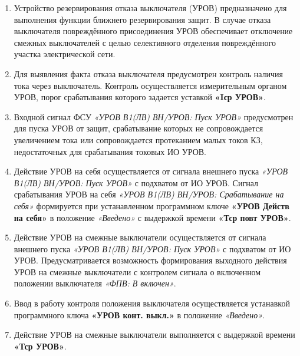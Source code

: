 \color{black}

\begin{enumerate}

\item
Устройство резервирования отказа выключателя (УРОВ) предназначено для выполнения функции ближнего резервирования защит. В случае отказа выключателя повреждённого присоединения УРОВ обеспечивает отключение смежных выключателей с целью селективного отделения повреждённого участка электрической сети.

\item
Для выявления факта отказа выключателя предусмотрен контроль наличия тока через выключатель. Контроль осуществляется измерительным органом УРОВ, порог срабатывания которого задается уставкой \textbf{«Iср УРОВ»}.

\item
Входной сигнал ФСУ \textit{«УРОВ В1(ЛВ) ВН/УРОВ: Пуск УРОВ»} предусмотрен для пуска УРОВ от защит, срабатывание которых не сопровождается увеличением тока или сопровождается протеканием малых токов КЗ, недостаточных для срабатывания токовых ИО УРОВ.

\item
Действие УРОВ на себя осуществляется от сигнала внешнего пуска \textit{«УРОВ В1(ЛВ) ВН/УРОВ: Пуск УРОВ»} с подхватом от ИО УРОВ.
Сигнал срабатывания УРОВ на себя \textit{«УРОВ В1(ЛВ) ВН/УРОВ: Срабатывание на себя»} формируется при устанавленном программном ключе \textbf{«УРОВ Действ на себя»} в положение \textit{«Введено»} с выдержкой времени \textbf{«Тср повт УРОВ»}.

\item
Действие УРОВ на смежные выключатели осуществляется от сигнала внешнего пуска \textit{«УРОВ В1(ЛВ) ВН/УРОВ: Пуск УРОВ»} с подхватом от ИО УРОВ. Предусматривается возможность формирования выходного действия УРОВ на смежные выключатели с контролем сигнала о включенном положении выключателя \textit{«ФПВ: В включен»}.

\item
Ввод в работу контроля положения выключателя осуществляется устанавкой программного ключа \textbf{«УРОВ конт. выкл.»} в положение \textit{«Введено»}.

\item
Действие УРОВ на смежные выключатели выполняется с выдержкой времени \textbf{«Тср УРОВ»}.


\end{enumerate}
